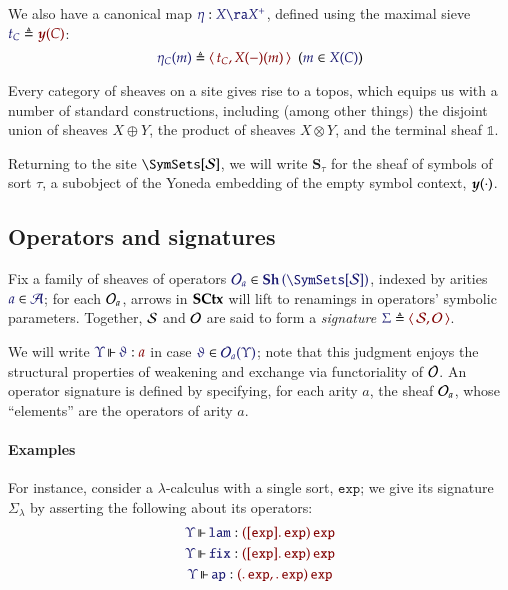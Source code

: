 \documentclass[11pt]{article}
\theoremstyle{definition}
\theoremstyle{remark}
\numberwithin{equation}{section}
\newcommand\SortExp{\mathtt{exp}}
\newcommand\Sheaves[1]{\mathbf{Sh}\left(#1\right)}
\newcommand\SCtxSite{\SymSets[\Sorts]}
\begin{document}
We also have a canonical map $\Of{\eta}{X\ra X^+}$, defined
using the maximal sieve $\Define{t_C}{\Yoneda{C}}$:
\[
  \HypJ{
    \Define{\eta_C(m)}{
      \Pair{t_C}{
        X(-)(m)
      }
    }
  }{
    \Member{m}{X(C)}
  }
\]


Every category of sheaves on a site gives rise to a topos, which equips us with
a number of standard constructions, including (among other things) the disjoint
union of sheaves $X\oplus Y$, the product of sheaves $X\otimes Y$, and the terminal sheaf $\mathbb{1}$.

Returning to the site $\SCtxSite$, we will write $\mathbf{S}_\tau$ for the sheaf
of symbols of sort $\tau$, a subobject of the Yoneda embedding of the empty
symbol context, $\boldsymbol{y} (\cdot)$.

\subsection{Operators and signatures}

Fix a family of sheaves of operators
$\Member{\Operators_a}{\Sheaves{\SCtxSite}}$, indexed by arities
$\Member{a}{\Arities}$; for each $\mathcal{O}_a$, arrows in $\mathbf{SCtx}$ will lift to
renamings in operators' symbolic parameters. Together, $\mathcal{S}$ and $\mathcal{O}$ are said to form a \emph{signature}
$\Define{\Sigma}{\Pair{\Sorts}{\Operators}}$.

We will write $\IsOperator{\Upsilon}{\vartheta}{a}$ in case
$\Member{\vartheta}{\Operators_a(\Upsilon)}$; note that this judgment enjoys
the structural properties of weakening and exchange via functoriality of
$\mathcal{O}$. An operator signature is defined by specifying, for each arity
$a$, the sheaf $\mathcal{O}_a$, whose ``elements'' are the operators of arity
$a$.


\paragraph{Examples}

For instance, consider a $\lambda$-calculus with a single sort, $\SortExp$; we
give its signature $\Sigma_{\lambda}$ by asserting the following about its
operators:
\begin{gather*}
  \IsOperator{\Upsilon}{\mathtt{lam}}{
    \MkArity{
      \MkValence{}{\SortExp}{\SortExp}
    }{\SortExp}
  }\\
  \IsOperator{\Upsilon}{\mathtt{fix}}{
    \MkArity{
      \MkValence{}{\SortExp}{\SortExp}
    }{\SortExp}
  }\\
  \IsOperator{\Upsilon}{\mathtt{ap}}{
    \MkArity{
      \MkValence{}{}{\SortExp},
      \MkValence{}{}{\SortExp}
    }{\SortExp}
  }
\end{gather*}
\end{document}
